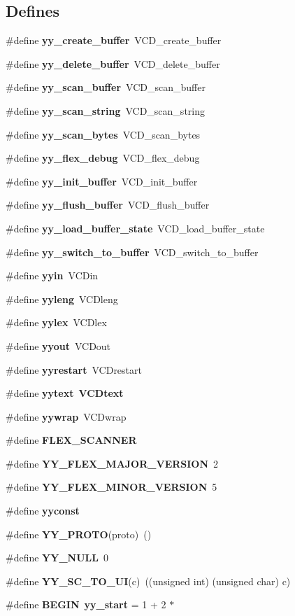 \subsection*{Defines}
\begin{CompactItemize}
\item 
\#define {\bf yy\_\-create\_\-buffer}\ VCD\_\-create\_\-buffer
\item 
\#define {\bf yy\_\-delete\_\-buffer}\ VCD\_\-delete\_\-buffer
\item 
\#define {\bf yy\_\-scan\_\-buffer}\ VCD\_\-scan\_\-buffer
\item 
\#define {\bf yy\_\-scan\_\-string}\ VCD\_\-scan\_\-string
\item 
\#define {\bf yy\_\-scan\_\-bytes}\ VCD\_\-scan\_\-bytes
\item 
\#define {\bf yy\_\-flex\_\-debug}\ VCD\_\-flex\_\-debug
\item 
\#define {\bf yy\_\-init\_\-buffer}\ VCD\_\-init\_\-buffer
\item 
\#define {\bf yy\_\-flush\_\-buffer}\ VCD\_\-flush\_\-buffer
\item 
\#define {\bf yy\_\-load\_\-buffer\_\-state}\ VCD\_\-load\_\-buffer\_\-state
\item 
\#define {\bf yy\_\-switch\_\-to\_\-buffer}\ VCD\_\-switch\_\-to\_\-buffer
\item 
\#define {\bf yyin}\ VCDin
\item 
\#define {\bf yyleng}\ VCDleng
\item 
\#define {\bf yylex}\ VCDlex
\item 
\#define {\bf yyout}\ VCDout
\item 
\#define {\bf yyrestart}\ VCDrestart
\item 
\#define {\bf yytext}\ {\bf VCDtext}
\item 
\#define {\bf yywrap}\ VCDwrap
\item 
\#define {\bf FLEX\_\-SCANNER}
\item 
\#define {\bf YY\_\-FLEX\_\-MAJOR\_\-VERSION}\ 2
\item 
\#define {\bf YY\_\-FLEX\_\-MINOR\_\-VERSION}\ 5
\item 
\#define {\bf yyconst}
\item 
\#define {\bf YY\_\-PROTO}(proto)\ ()
\item 
\#define {\bf YY\_\-NULL}\ 0
\item 
\#define {\bf YY\_\-SC\_\-TO\_\-UI}(c)\ ((unsigned int) (unsigned char) c)
\item 
\#define {\bf BEGIN}\ {\bf yy\_\-start} = 1 + 2 $\ast$

\end{CompactItemize}
